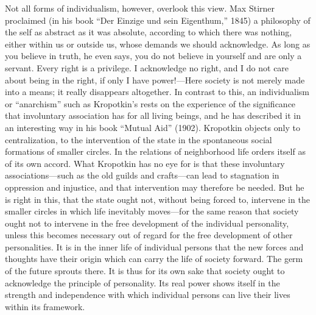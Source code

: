 \documentclass[12pt]{article}
\newcommand{\opage}[1]{\marginnote{\footnotesize\textit{[#1]}}}
\begin{document}
Not all forms of individualism, however, overlook this view. Max Stirner
proclaimed (in his book ``Der Einzige und sein Eigenthum,'' 1845) a philosophy of
the self as abstract as it was absolute, according to which there was nothing,
either within us or outside us, whose demands we should acknowledge. As long as
you believe in truth,
\opage{45}%
he even says, you do not believe in yourself and are only a servant. Every right
is a privilege. I acknowledge no right, and I do not care about being in the
right, if only I have power!---Here society is not merely made into a means; it
really disappears altogether. In contrast to this, an individualism or
``anarchism'' such as Kropotkin's rests on the experience of the significance
that involuntary association has for all living beings, and he has described it
in an interesting way in his book ``Mutual Aid'' (1902). Kropotkin objects only
to centralization, to the intervention of the state in the spontaneous social
formations of smaller circles. In the relations of neighborhood life orders
itself as of its own accord. What Kropotkin has no eye for is that these
involuntary associations---such as the old guilds and crafts---can lead to
stagnation in oppression and injustice, and that intervention may therefore be
needed. But he is right in this, that the state ought not, without being forced
to, intervene in the smaller circles in which life inevitably moves---for the
same reason that society ought not to intervene in the free development of the
individual
\opage{46}%
personality, unless this becomes necessary out of regard for the free
development of other personalities. It is in the inner life of individual
persons that the new forces and thoughts have their origin which can carry the
life of society forward. The germ of the future sprouts there. It is thus for
its own sake that society ought to acknowledge the principle of personality. Its
real power shows itself in the strength and independence with which individual
persons can live their lives within its framework.
\end{document}
